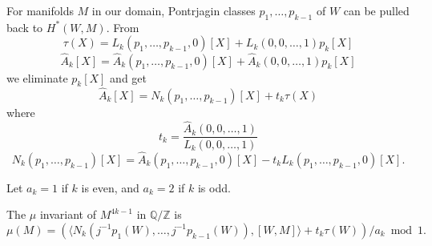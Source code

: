 \documentclass[twoside]{article}
\begin{document}
For manifolds $M$ in our domain, Pontrjagin classes $p_1, \dots  ,p_{k-1}$ of $W$ can be pulled back to $H^*(W,M)$. From
\[
\tau(X) = L_k(p_1, \dots  ,p_{k-1},0)[X] + L_k(0,0, \dots  ,1)p_k[X]
\]
\[
\widehat{A}_k[X] = \widehat{A}_k(p_1, \dots  ,p_{k-1},0)[X] + \widehat{A}_k(0,0, \dots  ,1)p_k[X]
\]
we eliminate $p_k[X]$ and get
\[
\widehat{A}_k[X] = N_k(p_1, \dots  ,p_{k-1})[X] + t_k\tau(X)
\]
where 
\[
t_k = \frac{\widehat{A}_k(0,0, \dots  ,1)}{L_k(0,0, \dots  ,1)}
\]
\[
N_k(p_1, \dots  ,p_{k-1})[X] = \widehat{A}_k(p_1, \dots  ,p_{k-1},0)[X]-t_kL_k(p_1, \dots  ,p_{k-1},0)[X]. 
\]

Let $a_k = 1$ if $k$ is even, and $a_k = 2$ if $k$ is odd. 

\begin{define}
	The $\mu$ invariant of $M^{4k-1}$ in $\mathbb{Q}/\mathbb{Z}$ is 
	\[
	\mu(M) = (\langle N_k(j^{-1}p_1(W), \dots  ,j^{-1}p_{k-1}(W)),[W,M]\rangle + t_k\tau(W))/a_k  \bmod  1. 
	\]
\end{define}
\end{document}
